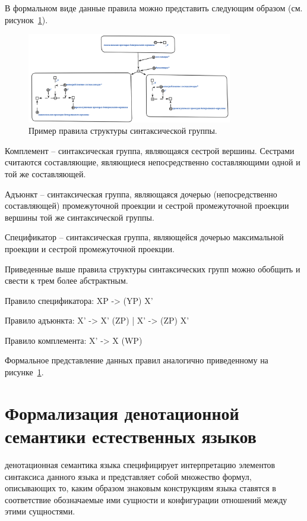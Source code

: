 В формальном виде данные правила можно представить следующим образом (см. рисунок~\ref{fig:pic_tree_structure_rule}).

\begin{figure}[h]
    \centering
    \includegraphics[width=0.8\textwidth]{images/part2/chapter_lang/tree_structure_rule.png}
    \caption{Пример правила структуры синтаксической группы.}
    \label{fig:pic_tree_structure_rule}
\end{figure}

Комплемент -- синтаксическая группа, являющаяся сестрой вершины. Сестрами считаются составляющие, являющиеся непосредственно составляющими одной и той же составляющей.

Адъюнкт -- синтаксическая группа, являющаяся дочерью (непосредственно составляющей) промежуточной проекции и сестрой промежуточной проекции вершины той же синтаксической группы.

Спецификатор -- синтаксическая группа, являющейся дочерью максимальной проекции и сестрой промежуточной проекции.

Приведенные выше правила структуры синтаксических групп можно обобщить и свести к трем более абстрактным.

Правило спецификатора: XP -> (YP) X'

Правило адъюнкта: X' -> X' (ZP) | X' -> (ZP) X'

Правило комплемента: X' -> X (WP)

Формальное представление данных правил аналогично приведенному на рисунке~\ref{fig:pic_tree_structure_rule}.

\section{Формализация денотационной семантики естественных языков}

денотационная семантика языка специфицирует интерпретацию элементов синтаксиса данного языка и представляет собой множество формул, описывающих то, каким образом знаковым конструкциям языка ставятся в соответствие обозначаемые ими сущности и конфигурации отношений между этими сущностями.

